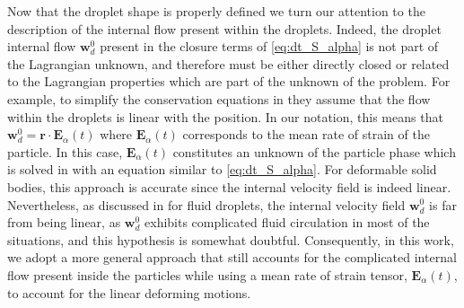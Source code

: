 Now that the droplet shape is properly defined we turn our attention to the description of the internal flow present within the droplets.
Indeed, the droplet internal flow $\textbf{w}_d^0$ present in the closure terms of \ref{eq:dt_S_alpha} is not part of the Lagrangian unknown, and therefore must be either directly closed or related to the Lagrangian properties which are part of the unknown of the problem.  
For example, to simplify the conservation equations in \citet{lhuillier1987phenomenology} they assume that the flow within the droplets is linear with the position. 
In our notation, this means that $\textbf{w}_d^0 = \textbf{r}\cdot \textbf{E}_\alpha(t)$ where $\textbf{E}_\alpha(t)$ corresponds to the mean rate of strain of the particle. 
In this case, $\textbf{E}_\alpha(t)$ constitutes an unknown of the particle phase which is solved in \citet{lhuillier1987phenomenology} with an equation similar to \ref{eq:dt_S_alpha}. 
For deformable solid bodies, this approach is accurate since the internal velocity field is indeed linear.
Nevertheless, as discussed in \citet{lhuillier1987phenomenology} for fluid droplets, the internal velocity field $\textbf{w}_d^0$ is far from being linear, as $\textbf{w}_d^0$ exhibits complicated fluid circulation in most of the situations, and this hypothesis is somewhat doubtful. 
Consequently, in this work, we adopt a more general approach that still accounts for the complicated internal flow present inside the particles while using a mean rate of strain tensor, $\textbf{E}_\alpha(t)$, to account for the linear deforming motions. 

